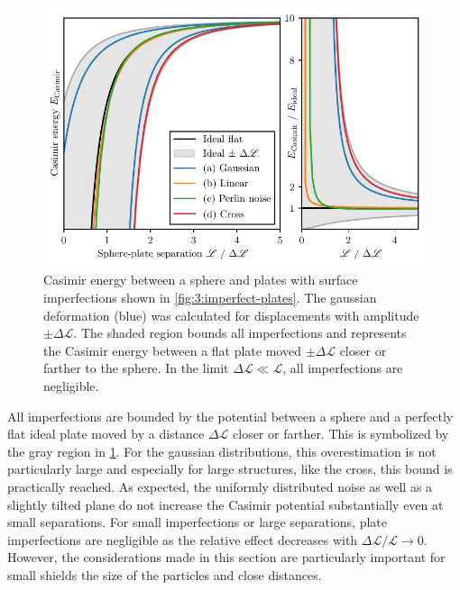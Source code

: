\begin{figure}[!htbp]
  \centering
  \includegraphics[width=\textwidth]{../figures/casimir/casimir-potential-imperfect-plates-relative.pdf}
  \caption{Casimir energy between a sphere and plates with surface imperfections shown in \cref{fig:3:imperfect-plates}. 
  The gaussian deformation (blue) was calculated for displacements with amplitude $\pm\Delta\mathscr{L}$. The shaded region bounds all imperfections and represents the Casimir energy between a flat plate moved $\pm\Delta\mathscr{L}$ closer or farther to the sphere. In the limit $\Delta \mathscr{L} \ll \mathscr{L}$, all imperfections are negligible.}
  \label{fig:3:casimir-imperfect-plates}
\end{figure}
All imperfections are bounded by the potential between a sphere and a perfectly flat ideal plate moved by a distance $\Delta \mathscr{L}$ closer or farther.
This is symbolized by the gray region in \cref{fig:3:casimir-imperfect-plates}.
For the gaussian distributions, this overestimation is not particularly large and especially for large structures, like the cross, this bound is practically reached.
As expected, the uniformly distributed noise as well as a slightly tilted plane do not increase the Casimir potential substantially even at small separations.
For small imperfections or large separations, plate imperfections are negligible as the relative effect decreases with $\Delta \mathscr{L}/\mathscr{L} \rightarrow 0$.
However, the considerations made in this section are particularly important for small shields the size of the particles and close distances.